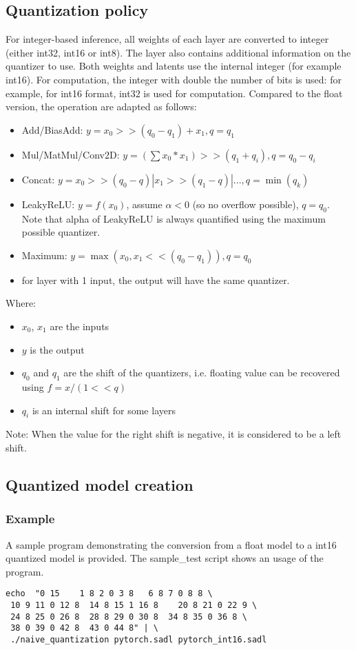 \documentclass[10pt,a4paper]{article}
\begin{document}
\subsection{Quantization policy}
For integer-based inference, all weights of each layer are converted to integer (either int32, int16 or int8). The layer also contains additional information on the quantizer to use.
Both weights and latents use the internal integer (for example int16). For computation, the integer with double the number of bits is used: for example, for int16 format, int32 is used for computation.
Compared to the float version, the operation are adapted as follows:
\begin{itemize}
\item Add/BiasAdd: $y = x_0>>(q_0-q_1) + x_1, q=q_1$
\item Mul/MatMul/Conv2D: $y = (\sum x_0*x_1)>>(q_1+q_i), q=q_0-q_i$
\item Concat: $y = x_0>>(q_0-q)|x_1>>(q_1-q)|..., q=\min(q_k)$ 
\item LeakyReLU: $y = f(x_0)$, assume $\alpha < 0$ (so no overflow possible), $q=q_0$. Note that alpha of LeakyReLU is always quantified using the maximum possible quantizer.
\item Maximum: $y = \max(x_0, x_1<<(q_0-q_1)), q=q_0$
\item for layer with 1 input, the output will have the same quantizer.
\end{itemize}
Where:
\begin{itemize}
\item $x_0$, $x_1$ are the inputs
\item $y$ is the output
\item $q_0$ and $q_1$ are the shift of the quantizers, i.e. floating value can be recovered using $f = x/(1<<q)$
\item $q_i$ is an internal shift for some layers
\end{itemize}

Note: When the value for the right shift is negative, it is considered to be a left shift.

\subsection{Quantized model creation}
\subsubsection{Example}
A sample program demonstrating the conversion from a float model to a int16 quantized model is provided. The sample\_test script shows an usage of the program.
\begin{lstlisting}[caption={SADL quantized model conversion},style=code]
echo  "0 15    1 8 2 0 3 8   6 8 7 0 8 8 \
 10 9 11 0 12 8  14 8 15 1 16 8    20 8 21 0 22 9 \
 24 8 25 0 26 8  28 8 29 0 30 8  34 8 35 0 36 8 \
 38 0 39 0 42 8  43 0 44 8" | \
 ./naive_quantization pytorch.sadl pytorch_int16.sadl
\end{lstlisting}
\end{document}
